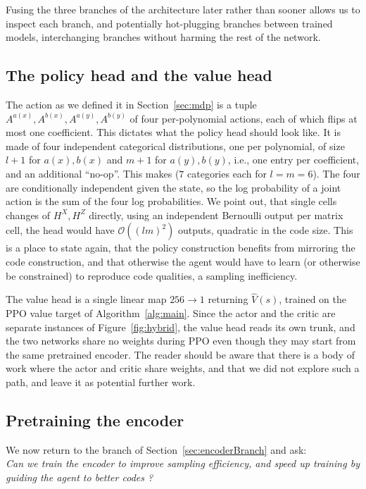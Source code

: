 \noindent Fusing the three branches of the architecture later rather than sooner allows us to inspect 
each branch, and potentially hot-plugging branches between trained models, interchanging branches without harming the rest of the network.

\subsection{The policy head and the value head\label{sec:heads}}
The action as we defined it in Section~\ref{sec:mdp} is a tuple \(A^{a(x)},A^{b(x)},A^{a(y)},A^{b(y)}\) of four
per-polynomial actions, each of which flips at most one coefficient. This dictates what the policy head 
should look like. It is made of four independent categorical distributions, one per polynomial, 
of size \(l+1\) for \(a(x),b(x)\) and \(m+1\) for \(a(y),b(y)\), i.e., 
one entry per coefficient, and an additional ``no-op''.
This makes (\(7\) categories each for \(l=m=6\)). 
The four are conditionally independent given the state, 
so the log probability of a joint action is the sum of the four log probabilities. 
\noindent We point out, that single cells changes of \(H^X,H^Z\) directly, using an independent Bernoulli output per matrix cell, 
the head would have \(\mathcal{O}({(lm)}^{2})\) outputs, quadratic in the code size.
This is a place to state again, that the policy construction benefits from mirroring the code construction, and that otherwise the agent would have to learn
(or otherwise be constrained) to reproduce code qualities, a sampling inefficiency.

\noindent The value head is a single linear map \(256 \to 1\) returning \(\hat V(s)\), trained on the PPO value
target of Algorithm~\ref{alg:main}.
Since the actor and the critic are separate instances of Figure~\ref{fig:hybrid}, 
the value head reads its own trunk, and the two networks share no weights during
PPO even though they may start from the same pretrained encoder. 
The reader should be aware that there is a body of work where the actor and critic share weights, and that we did not explore such 
a path, and leave it as potential further work.


\subsection{Pretraining the encoder\label{sec:critic}}
We now return to the branch of Section~\ref{sec:encoderBranch} and ask:\\
\textit{Can we train the encoder to improve sampling efficiency, and speed up training by guiding the agent to better codes ?}\\


